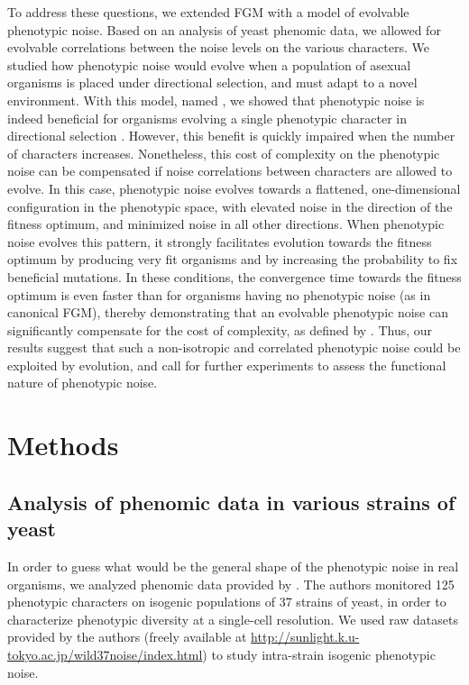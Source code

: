 To address these questions, we extended FGM with a model of evolvable phenotypic noise.
Based on an analysis of yeast phenomic data, we allowed for evolvable correlations between the noise levels on the various characters.
We studied how phenotypic noise would evolve when a population of asexual organisms is placed under directional selection, and must adapt to a novel environment.
With this model, named {\sigmaFGM}, we showed that phenotypic noise is indeed beneficial for organisms evolving a single phenotypic character in directional selection \citep{zhang-et-al-2009,eldar-and-elowitz-2010}.
However, this benefit is quickly impaired when the number of characters increases. Nonetheless, this cost of complexity on the phenotypic noise can be compensated if noise correlations between characters are allowed to evolve. In this case, phenotypic noise evolves towards a flattened, one-dimensional configuration in the phenotypic space, with elevated noise in the direction of the fitness optimum, and minimized noise in all other directions.
When phenotypic noise evolves this pattern, it strongly facilitates evolution towards the fitness optimum by producing very fit organisms and by increasing the probability to fix beneficial mutations. In these conditions, the convergence time towards the fitness optimum is even faster than for organisms having no phenotypic noise (as in canonical FGM), thereby demonstrating that an evolvable phenotypic noise can significantly compensate for the cost of complexity, as defined by \cite{fisher-1930}. Thus, our results suggest that such a non-isotropic and correlated phenotypic noise could be exploited by evolution, and call for further experiments to assess the functional nature of phenotypic noise.


\section{Methods}


\subsection*{Analysis of phenomic data in various strains of yeast}

In order to guess what would be the general shape of the phenotypic noise in real organisms, we analyzed phenomic data provided by \cite{yvert-et-al-2013}. The authors monitored 125 phenotypic characters on isogenic populations of 37  strains of yeast, in order to characterize phenotypic diversity at a single-cell resolution. We used raw datasets provided by the authors (freely available at \href{http://sunlight.k.u-tokyo.ac.jp/wild37noise/index.html}{http://sunlight.k.u-tokyo.ac.jp/wild37noise/index.html}) to study intra-strain isogenic phenotypic noise. 

